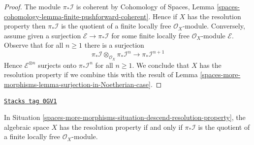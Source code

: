 \begin{proof}
The module $\pi_*\mathcal{I}$ is coherent by
Cohomology of Spaces, Lemma
\ref{spaces-cohomology-lemma-finite-pushforward-coherent}.
Hence if $X$ has the resolution property then $\pi_*\mathcal{I}$
is the quotient of a finite locally free $\mathcal{O}_X$-module.
Conversely, assume given a surjection $\mathcal{E} \to \pi_*\mathcal{I}$
for some finite locally free $\mathcal{O}_X$-module $\mathcal{E}$.
Observe that for all $n \geq 1$ there is a surjection
$$
\pi_*\mathcal{I} \otimes_{\mathcal{O}_X} \pi_*\mathcal{I}^n
\longrightarrow
\pi_*\mathcal{I}^{n + 1}
$$
Hence $\mathcal{E}^{\otimes n}$ surjects onto
$\pi_*\mathcal{I}^n$ for all $n \geq 1$. We conclude that $X$
has the resolution property if we combine this with the
result of Lemma \ref{spaces-more-morphisms-lemma-surjection-in-Noetherian-case}.
\end{proof}

\begin{lemma}
\label{spaces-more-morphisms-lemma-resolution-property-one-sheaf}
\href{https://stacks.math.columbia.edu/tag/0GV1}{\texttt{Stacks tag 0GV1}}

In Situation \ref{spaces-more-morphisms-situation-descend-resolution-property},
the algebraic space $X$ has the resolution property
if and only if $\pi_*\mathcal{I}$ is the quotient of a
finite locally free $\mathcal{O}_X$-module.
\end{lemma}

